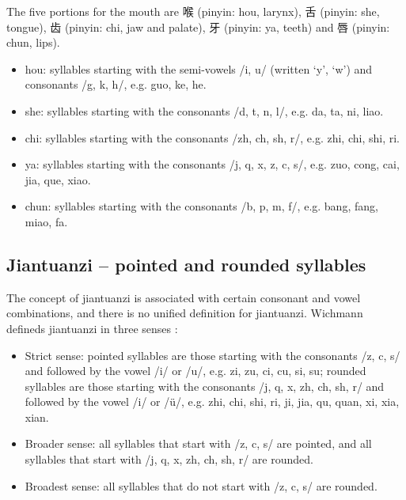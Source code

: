 The five portions for the mouth are 喉 (pinyin: hou, larynx), 舌 (pinyin: she, tongue), 齿 (pinyin: chi, jaw and palate), 牙 (pinyin: ya, teeth) and 唇 (pinyin: chun, lips).
\begin{itemize}[itemsep=0pt]
\item hou: syllables starting with the semi-vowels /i, u/ (written `y', `w') and consonants /g, k, h/, e.g. guo, ke, he.
\item she: syllables starting with the consonants /d, t, n, l/, e.g. da, ta, ni, liao.
\item chi: syllables starting with the consonants /zh, ch, sh, r/, e.g. zhi, chi, shi, ri.
\item ya: syllables starting with the consonants /j, q, x, z, c, s/, e.g. zuo, cong, cai, jia, que, xiao.
\item chun: syllables starting with the consonants /b, p, m, f/, e.g. bang, fang, miao, fa.
\end{itemize}

\subsection{Jiantuanzi -- pointed and rounded syllables}\label{sec:ch2:jiantuanzi}

The concept of \gls{jiantuanzi} is associated with certain consonant and vowel combinations, and there is no unified definition for \gls{jiantuanzi}. Wichmann defineds \gls{jiantuanzi} in three senses \cite{Wichmann1991a}:
\begin{itemize}[itemsep=0pt]
\item Strict sense: pointed syllables are those starting with the consonants /z, c, s/ and followed by the vowel /i/ or /u/, e.g. zi, zu, ci, cu, si, su; rounded syllables are those starting with the consonants /j, q, x, zh, ch, sh, r/ and followed by the vowel /i/ or /ü/, e.g. zhi, chi, shi, ri, ji, jia, qu, quan, xi, xia, xian.
\item Broader sense: all syllables that start with /z, c, s/ are pointed, and all syllables that start with /j, q, x, zh, ch, sh, r/ are rounded.
\item Broadest sense: all syllables that do not start with /z, c, s/ are rounded.
\end{itemize}

